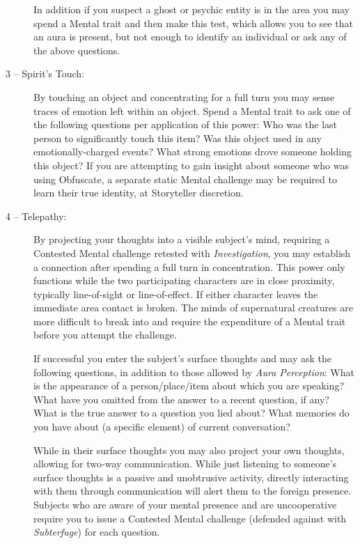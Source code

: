 \begin{description}
	In addition if you suspect a ghost or psychic entity is in the area you may spend a Mental 
	trait and then make this test, which allows you to see that an aura is present, but not 
	enough to identify an individual or ask any of the above questions.  
	\item[3 -- Spirit's Touch:]  By touching an object and concentrating for a full 
	turn you may sense traces of emotion left within an object.  Spend a Mental 
	trait to ask one of the following questions per application of this power:  Who 
	was the last person to significantly touch this item?  Was this object used in 
	any emotionally-charged events?  What strong emotions drove someone holding 
	this object?  If you are attempting to gain insight about someone who was 
	using Obfuscate, a separate static Mental challenge may be required to learn their 
	true identity, at Storyteller discretion.
	\item[4 -- Telepathy:]  By projecting your thoughts into a visible subject's 
	mind, requiring a Contested Mental challenge retested with \emph{Investigation}, 
	you may establish a connection after spending a full turn in concentration.  
	This power only functions while the two participating characters are in close 
	proximity, typically line-of-sight or line-of-effect.  If either character leaves 
	the immediate area contact is broken. The minds of supernatural creatures are more 
	difficult to break into and require the expenditure of a Mental trait before you 
	attempt the challenge.
	
	If successful you enter the subject's surface thoughts and may ask the following 
	questions, in addition to those allowed by \emph{Aura Perception}:  What 
	is the appearance of a person/place/item about which you are speaking?  What 
	have you omitted from the answer to a recent question, if any?  What is the true 
	answer to a question you lied about?  What memories do you have about (a specific 
	element) of current conversation? 
	
	While in their surface thoughts you may also project your own thoughts, 
	allowing for two-way communication.  While just listening to someone's surface thoughts 
	is a passive and unobtrusive activity, directly interacting with them through 
	communication will alert them to the foreign presence. Subjects who are aware of your mental 
	presence and are uncooperative require you to issue a Contested Mental challenge 
	(defended against with \emph{Subterfuge}) for each question.
	

\end{description}
